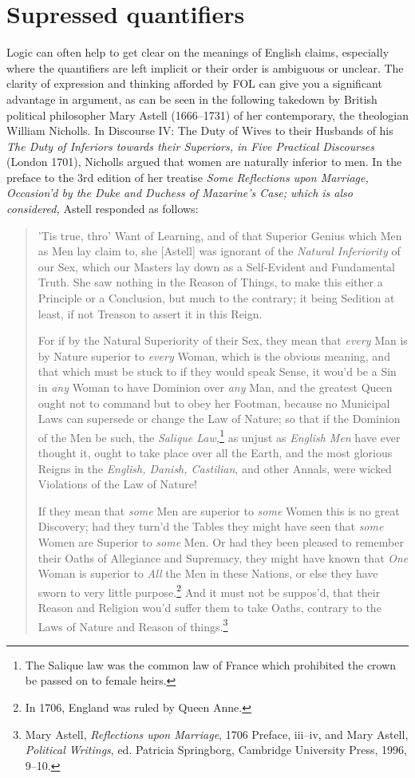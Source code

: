\section{Supressed quantifiers}

Logic can often help to get clear on the meanings of English claims,
especially where the quantifiers are left implicit or their order is
ambiguous or unclear. The clarity of expression and thinking afforded
by FOL can give you a significant advantage in argument, as can be
seen in the following takedown by British political philosopher Mary
Astell (1666--1731) of her contemporary, the theologian William
Nicholls. In Discourse IV: The Duty of Wives to their Husbands of his
\textit{The Duty of Inferiors towards their Superiors, in Five
  Practical Discourses} (London 1701), Nicholls argued that women are
naturally inferior to men. In the preface to the 3rd edition of her
treatise \emph{Some Reflections upon Marriage, Occasion'd by the Duke
  and Duchess of Mazarine's Case; which is also considered,} Astell
responded as follows:
\begin{quotation}
'Tis true, thro' Want of Learning, and of that Superior Genius which
Men as Men lay claim to, she [Astell] was ignorant of the
\textit{Natural Inferiority} of our Sex, which our Masters lay down as
a Self-Evident and Fundamental Truth. She saw nothing in the Reason of
Things, to make this either a Principle or a Conclusion, but much to
the contrary; it being Sedition at least, if not Treason to assert it
in this Reign.

For if by the Natural Superiority of their Sex, they mean that
\textit{every} Man is by Nature superior to \textit{every} Woman,
which is the obvious meaning, and that which must be stuck to if they
would speak Sense, it wou'd be a Sin in \textit{any} Woman to have
Dominion over \textit{any} Man, and the greatest Queen ought not to
command but to obey her Footman, because no Municipal Laws can
supersede or change the Law of Nature; so that if the Dominion of the
Men be such, the \textit{Salique Law,}\footnote{The Salique law was
  the common law of France which prohibited the crown be passed on to
  female heirs.} as unjust as \textit{English Men} have ever thought
it, ought to take place over all the Earth, and the most glorious
Reigns in the \textit{English, Danish, Castilian}, and other Annals,
were wicked Violations of the Law of Nature!

If they mean that \textit{some} Men are superior to \textit{some}
Women this is no great Discovery; had they turn'd the Tables they
might have seen that \textit{some} Women are Superior to \textit{some}
Men. Or had they been pleased to remember their Oaths of Allegiance
and Supremacy, they might have known that \textit{One} Woman is
superior to \textit{All} the Men in these Nations, or else they have
sworn to very little purpose.\footnote{In 1706, England was ruled by
  Queen Anne.} And it must not be suppos'd, that their Reason and
Religion wou'd suffer them to take Oaths, contrary to the Laws of
Nature and Reason of things.\footnote{Mary Astell, \textit{Reflections
    upon Marriage}, 1706 Preface, iii--iv, and Mary Astell,
  \textit{Political Writings}, ed. Patricia Springborg, Cambridge
  University Press, 1996, 9--10.}
\end{quotation}
